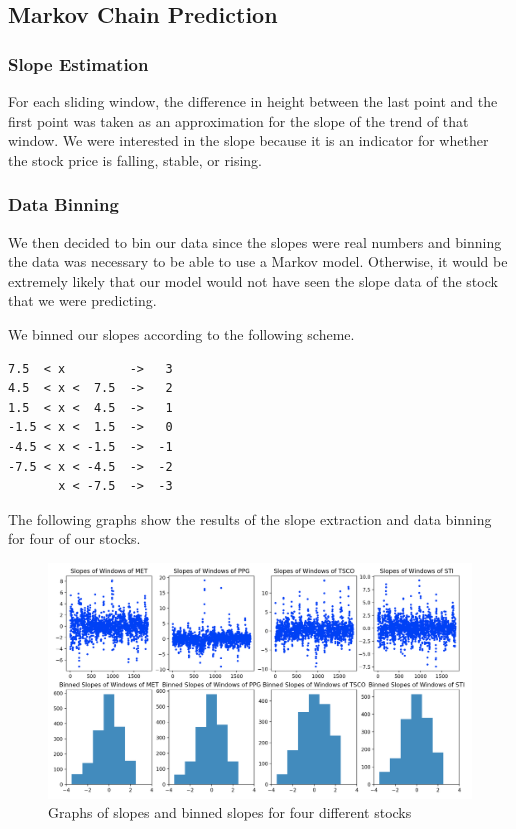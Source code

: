 \documentclass[final]{article}
\begin{document}
\subsection{Markov Chain Prediction}

\subsubsection{Slope Estimation}

For each sliding window, the difference in height between the last point and
the first point was taken as an approximation for the slope of the trend of
that window. We were interested in the slope because it is an indicator for
whether the stock price is falling, stable, or rising.

\subsubsection{Data Binning}

We then decided to bin our data since the slopes were real numbers and binning
the data was necessary to be able to use a Markov model. Otherwise, it would be
extremely likely that our model would not have seen the slope data of the stock
that we were predicting.

We binned our slopes according to the following scheme.


\begin{verbatim}
7.5  < x         ->   3
4.5  < x <  7.5  ->   2
1.5  < x <  4.5  ->   1
-1.5 < x <  1.5  ->   0
-4.5 < x < -1.5  ->  -1
-7.5 < x < -4.5  ->  -2
       x < -7.5  ->  -3
\end{verbatim}

The following graphs show the results of the slope extraction and data binning
for four of our stocks.

\begin{figure}[H]
  \centering
  \includegraphics[width=\linewidth]{img/slopes}
  \caption{Graphs of slopes and binned slopes for four different stocks}
  \label{fig:slopes}
\end{figure}
\end{document}
